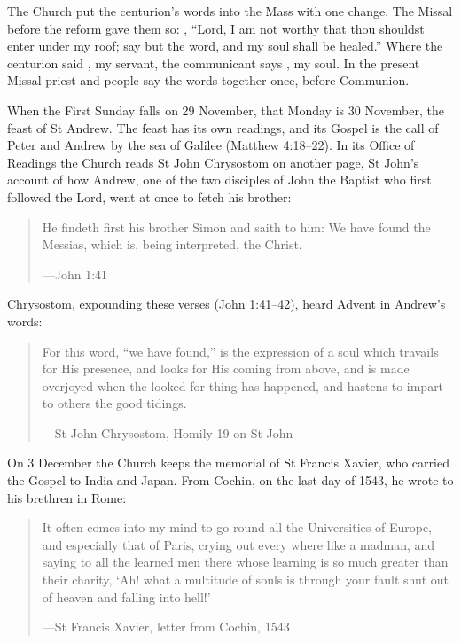 \noindent The Church put the centurion's words into the Mass with one change.
The Missal before the reform gave them so:
, ``Lord, I am not worthy that thou shouldst enter under my
roof; say but the word, and my soul shall be healed.'' Where the centurion said
, my servant, the communicant says , my soul.
In the present Missal priest and people say the words together once, before
Communion.

When the First Sunday falls on 29 November, that Monday is 30 November, the
feast of St Andrew. The feast has its own readings, and its Gospel is the call
of Peter and Andrew by the sea of Galilee (Matthew 4:18--22). In its Office of
Readings the Church reads St John Chrysostom on another page, St John's account
of how Andrew, one of the two disciples of John the Baptist who first followed
the Lord, went at once to fetch his brother:

\begin{quote}
He findeth first his brother Simon and saith to him: We have found the Messias,
which is, being interpreted, the Christ.\par
{\smallskip\noindent\small ---John 1:41\par}
\end{quote}

\noindent Chrysostom, expounding these verses (John 1:41--42), heard Advent in
Andrew's words:

\begin{quote}
For this word, ``we have found,'' is the expression of a soul which travails for
His presence, and looks for His coming from above, and is made overjoyed when
the looked-for thing has happened, and hastens to impart to others the good
tidings.\par
{\smallskip\noindent\small ---St John Chrysostom, Homily 19 on St John\par}
\end{quote}

On 3 December the Church keeps the memorial of St Francis Xavier, who carried
the Gospel to India and Japan. From Cochin, on the last day of 1543, he wrote to
his brethren in Rome:

\begin{quote}
It often comes into my mind to go round all the Universities of Europe, and
especially that of Paris, crying out every where like a madman, and saying to
all the learned men there whose learning is so much greater than their charity,
`Ah! what a multitude of souls is through your fault shut out of heaven and
falling into hell!'\par
{\smallskip\noindent\small ---St Francis Xavier, letter from Cochin, 1543\par}
\end{quote}

